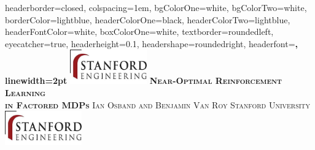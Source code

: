 \documentclass[landscape,a0paper,fontscale=0.285]{baposter} %
\theoremstyle{definition}
\begin{document}
\begin{poster}
{
headerborder=closed, %
colspacing=1em, %
bgColorOne=white, %
bgColorTwo=white, %
borderColor=lightblue, %
headerColorOne=black, %
headerColorTwo=lightblue, %
headerFontColor=white, %
boxColorOne=white, %
textborder=roundedleft, %
eyecatcher=true, %
headerheight=0.1\textheight, %
headershape=roundedright, %
headerfont=\Large\bf\textsc, %
linewidth=2pt %
}
%
{\includegraphics[height=4em]{logo}} %
{\bf\textsc{Near-Optimal Reinforcement Learning \\ \vspace{1mm} in Factored MDPs}\vspace{0.5em}} %
{\textsc{ Ian Osband and Benjamin Van Roy \hspace{12pt} Stanford University}} %
{\includegraphics[height=4em]{logo}} %



\end{poster}
\end{document}
